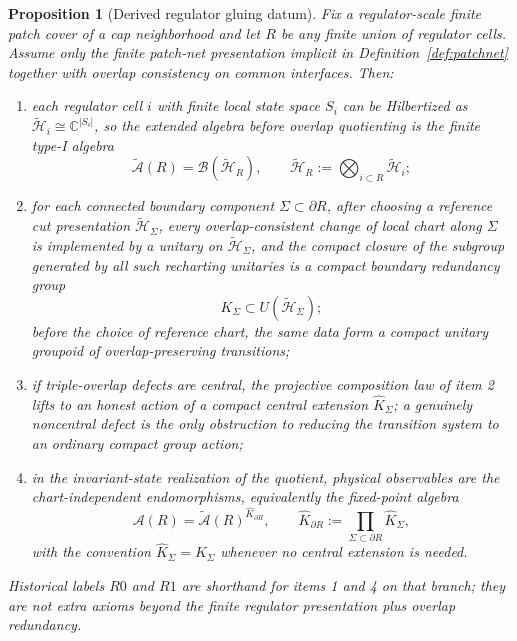 \documentclass[11pt]{article}
\newtheorem{proposition}[theorem]{Proposition}
\begin{document}
\begin{proposition}[Derived regulator gluing datum]\label{prop:regulatedrealization}
Fix a regulator-scale finite patch cover of a cap neighborhood and let \(R\) be any finite union of regulator cells. Assume only the finite patch-net presentation implicit in Definition~\ref{def:patchnet} together with overlap consistency on common interfaces. Then:
\begin{enumerate}[leftmargin=2em]
\item each regulator cell \(i\) with finite local state space \(S_i\) can be Hilbertized as \(\tilde{\mathcal H}_i\cong \mathbb C^{|S_i|}\), so the extended algebra before overlap quotienting is the finite type-I algebra
\[
\widetilde{\mathcal A}(R)=\mathcal B(\tilde{\mathcal H}_R),
\qquad
\tilde{\mathcal H}_R:=\bigotimes_{i\subset R}\tilde{\mathcal H}_i;
\]
\item for each connected boundary component \(\Sigma\subset\partial R\), after choosing a reference cut presentation \(\tilde{\mathcal H}_\Sigma\), every overlap-consistent change of local chart along \(\Sigma\) is implemented by a unitary on \(\tilde{\mathcal H}_\Sigma\), and the compact closure of the subgroup generated by all such recharting unitaries is a compact boundary redundancy group
\[
K_\Sigma\subset U(\tilde{\mathcal H}_\Sigma);
\]
before the choice of reference chart, the same data form a compact unitary groupoid of overlap-preserving transitions;
\item if triple-overlap defects are central, the projective composition law of item 2 lifts to an honest action of a compact central extension \(\widehat K_\Sigma\); a genuinely noncentral defect is the only obstruction to reducing the transition system to an ordinary compact group action;
\item in the invariant-state realization of the quotient, physical observables are the chart-independent endomorphisms, equivalently the fixed-point algebra
\[
\mathcal A(R)=\widetilde{\mathcal A}(R)^{\widehat K_{\partial R}},
\qquad
\widehat K_{\partial R}:=\prod_{\Sigma\subset\partial R}\widehat K_\Sigma,
\]
\noindent with the convention \(\widehat K_\Sigma=K_\Sigma\) whenever no central extension is needed.
\end{enumerate}
Historical labels \(R0\) and \(R1\) are shorthand for items 1 and 4 on that branch; they are not extra axioms beyond the finite regulator presentation plus overlap redundancy.
\end{proposition}
\end{document}
